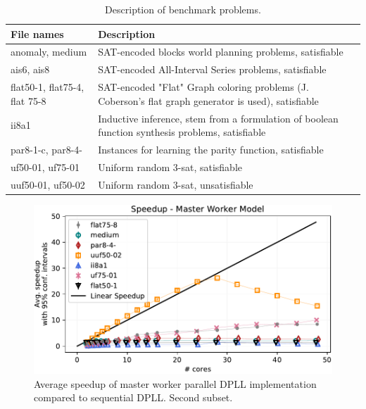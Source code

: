 \documentclass[letterpaper]{article}
\begin{document}
\begin{table}[h]
    \centering
    \begin{tabularx}{\columnwidth}{|p{2.6cm}|X|}
        \hline
        File names & Description\\
        \hline
        \hline
        anomaly, medium & SAT-encoded blocks world planning problems, satisfiable\\
        \hline
        ais6, ais8 & SAT-encoded All-Interval Series problems, satisfiable\\
        \hline
        flat50-1, flat75-4, flat 75-8 & SAT-encoded "Flat" Graph coloring problems (J. Coberson's flat graph generator is used), satisfiable\\
        \hline
        ii8a1 & Inductive inference, stem from a formulation of boolean function synthesis problems, satisfiable\\
        \hline
        par8-1-c, par8-4- & Instances for learning the parity function, satisfiable\\
        \hline
        uf50-01, uf75-01 & Uniform random 3-sat, satisfiable\\
        \hline
        uuf50-01, uf50-02 & Uniform random 3-sat, unsatisfiable\\
        \hline
    \end{tabularx}
    \caption{Description of benchmark problems.}
    \label{tab:benchmark_set}
\end{table}


\begin{figure}[p]
    \centering
    \includegraphics[width=\columnwidth]{figures/scaling_parallel_non_subset_dpll_scaling_tar.pdf}
    \caption{Average speedup of master worker parallel DPLL implementation compared to sequential DPLL.
    Second subset.}
    \label{fig:dpll_parallel_speedup_non}
\end{figure}
\end{document}
